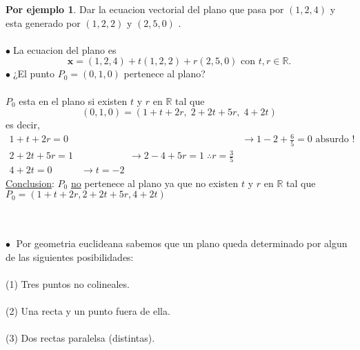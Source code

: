\documentclass{article}
\theoremstyle{definition}
\theoremstyle{definition}
\newtheorem*{ej}{Por ejemplo}
\theoremstyle{remark}
\newcommand\bl{$\bullet\;$}
\begin{document}
\begin{figure}[h]
\centering
\def\svgwidth{0.75\textwidth}

\end{figure}
\begin{ej}
  Dar la ecuacion vectorial del plano que pasa por $(1,2,4)$ y esta generado por $(1,2,2)$ y $(2,5,0)$ . \\ \\ 
  \bl La ecuacion del plano es \[ 
    \mathbf{x}=(1,2,4)+t(1,2,2)+r(2,5,0) \text{ con } t, r \in \mathbb{R}.
    \] \bl ¿El punto $P_0=(0,1,0)$ pertenece al plano? \\\\ $P_0$ esta en el plano si existen $t$ y $r$ en $\mathbb{R}$ tal que $$(0,1,0)=(1+t+2r,\; 2+2t+5r, \;4+2t)$$ es decir, \[
    \begin{array}{lll}
      1+t+2r=0 & & \longrightarrow 1-2+\frac{6}{5} = 0 \text{ absurdo !}\\
2+2t+5r =1 & \quad \quad \quad \quad \quad \longrightarrow 2-4+5r=1 \; \therefore r = \frac{3}{5} &  \\
4+2t = 0 & \to t = -2 & 
    \end{array}
  \] \underline{Conclusion}: $P_0$ \underline{no} pertenece al plano ya que no existen $t$ y $r$ en $\mathbb{R}$ tal que $P_0=(1+t+2r, 2+2t+5r,4+2t)$
\end{ej}
\; \\ \\ 
\textcolor{rojop2}{\bl} Por geometria euclideana sabemos que un plano queda determinado por algun de las siguientes posibilidades: \\\\
\textcolor{rojop2}{(1)} Tres puntos no colineales. \\\\
\textcolor{rojop2}{(2)} Una recta y un punto fuera de ella. \\\\ 
\textcolor{rojop2}{(3)} Dos rectas paralelsa (distintas). \\\\
\end{document}
